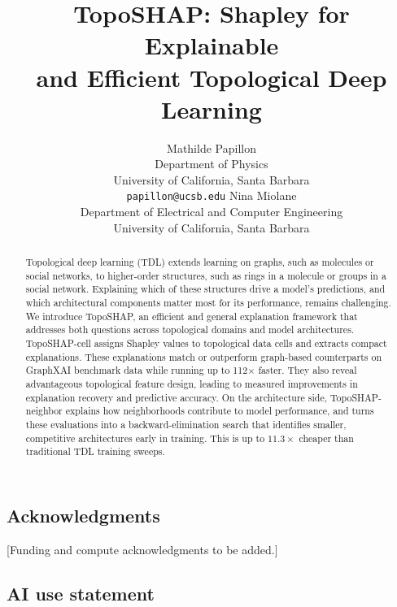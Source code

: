 \documentclass{article} %
\title{TopoSHAP: Shapley for 
  Explainable \\ and Efficient Topological Deep Learning}
\author{Mathilde Papillon \\
Department of Physics\\
University of California, Santa Barbara\\
\texttt{papillon@ucsb.edu}
\And
Nina Miolane \\
Department of Electrical and Computer Engineering\\
University of California, Santa Barbara\\
}
\begin{document}
\maketitle
\lhead{ } %
\begin{abstract}
Topological deep learning (TDL) extends learning on graphs, such as molecules or social networks, to higher-order structures, such as rings in a molecule or groups in a social network. Explaining which of these structures drive a model's predictions, and which architectural components matter most for its performance, remains challenging. We introduce TopoSHAP, an efficient and general explanation framework that addresses both questions across topological domains and model architectures. TopoSHAP-cell assigns Shapley values to topological data cells and extracts compact explanations. These explanations match or outperform graph-based counterparts on GraphXAI benchmark data while running up to 112$\times$ faster. They also reveal advantageous topological feature design, leading to measured improvements in explanation recovery and predictive accuracy. On the architecture side, TopoSHAP-neighbor explains how neighborhoods contribute to model performance, and turns these evaluations into a backward-elimination search that identifies smaller, competitive architectures early in training. This is up to $11.3\times$ cheaper than traditional TDL training sweeps.\end{abstract}










\subsection*{Acknowledgments}
[Funding and compute acknowledgments to be added.]

\subsection*{AI use statement}
\end{document}

